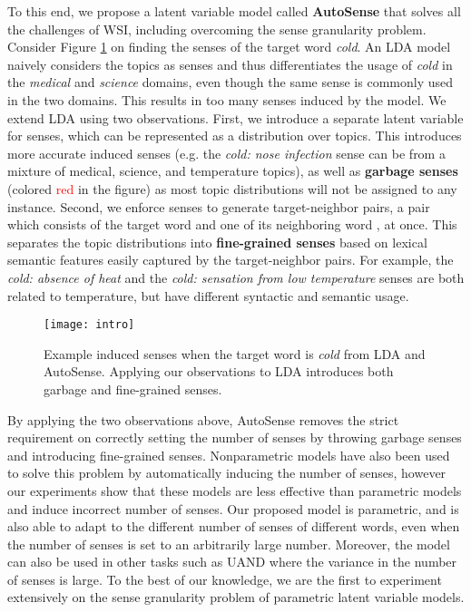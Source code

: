 \documentclass[letterpaper]{article} \usepackage{aaai19}
\begin{document}
To this end, we propose a latent variable model called \textbf{AutoSense} that solves all the challenges of WSI, including overcoming the sense granularity problem. Consider Figure \ref{fig:intuition} on finding the senses of the target word \textit{cold}. An LDA model naively considers the topics as senses and thus differentiates the usage of \textit{cold} in the \textit{medical} and \textit{science} domains, even though the same sense is commonly used in the two domains. This results in too many senses induced by the model. We extend LDA using two observations. First, we introduce a separate latent variable for senses, which can be represented as a distribution over topics. This introduces more accurate induced senses (e.g. the \textit{cold: nose infection} sense can be from a mixture of medical, science, and temperature topics), as well as \textbf{garbage senses} (colored \textcolor{red}{red} in the figure) as most topic distributions will not be assigned to any instance. Second, we enforce senses to generate target-neighbor pairs, a pair  which consists of the target word  and one of its neighboring word , at once. This separates the topic distributions into \textbf{fine-grained senses} based on lexical semantic features easily captured by the target-neighbor pairs. For example, the \textit{cold: absence of heat} and the \textit{cold: sensation from low temperature} senses are both related to temperature, but have different syntactic and semantic usage.

\begin{figure}
	\centering
	\texttt{[image: intro]}
	\caption{Example induced senses when the target word is \textit{cold} from LDA and AutoSense. Applying our observations to LDA introduces both garbage and fine-grained senses.}
	\label{fig:intuition}
\end{figure}

By applying the two observations above, AutoSense removes the strict requirement on correctly setting the number of senses by throwing garbage senses and introducing fine-grained senses. Nonparametric models \cite{teh2004sharing,lau2013unimelb} have also been used to solve this problem by automatically inducing the number of senses, however our experiments show that these models are less effective than parametric models and induce incorrect number of senses. Our proposed model is parametric, and is also able to adapt to the different number of senses of different words, even when the number of senses is set to an arbitrarily large number. Moreover, the model can also be used in other tasks such as UAND where the variance in the number of senses is large. To the best of our knowledge, we are the first to experiment extensively on the sense granularity problem of parametric latent variable models.
\end{document}
